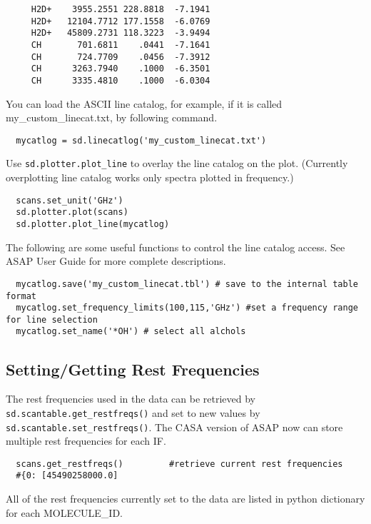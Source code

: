 \small
\begin{verbatim}
     H2D+    3955.2551 228.8818  -7.1941  
     H2D+   12104.7712 177.1558  -6.0769  
     H2D+   45809.2731 118.3223  -3.9494  
     CH       701.6811    .0441  -7.1641  
     CH       724.7709    .0456  -7.3912  
     CH      3263.7940    .1000  -6.3501  
     CH      3335.4810    .1000  -6.0304
\end{verbatim}
\normalsize
You can load the ASCII line catalog, for example, if
it is called my\_custom\_linecat.txt,
by following command.

\small
\begin{verbatim}
  mycatlog = sd.linecatlog('my_custom_linecat.txt')
\end{verbatim}
\normalsize

Use {\tt sd.plotter.plot\_line} to overlay the line catalog on 
the plot. (Currently overplotting line catalog works only spectra plotted
in frequency.)

\small
\begin{verbatim}
  scans.set_unit('GHz')
  sd.plotter.plot(scans)
  sd.plotter.plot_line(mycatlog)
\end{verbatim}
\normalsize

The following are some useful functions to control the line catalog
access. See ASAP User Guide for more complete descriptions.

\small
\begin{verbatim}
  mycatlog.save('my_custom_linecat.tbl') # save to the internal table format
  mycatlog.set_frequency_limits(100,115,'GHz') #set a frequency range for line selection
  mycatlog.set_name('*OH') # select all alchols
\end{verbatim}
\normalsize


\subsection{Setting/Getting Rest Frequencies}
\label{subsection:sd.asap.restfreqs}

The rest frequencies used in the data can be retrieved by 
{\tt sd.scantable.get\_restfreqs()} and set to new values by 
{\tt sd.scantable.set\_restfreqs()}.
The CASA version of ASAP now can store multiple rest frequencies 
for each IF.

\small
\begin{verbatim}
  scans.get_restfreqs()         #retrieve current rest frequencies
  #{0: [45490258000.0]
\end{verbatim}
All of the rest frequencies currently set to the data are listed in
python dictionary for each MOLECULE\_ID.

